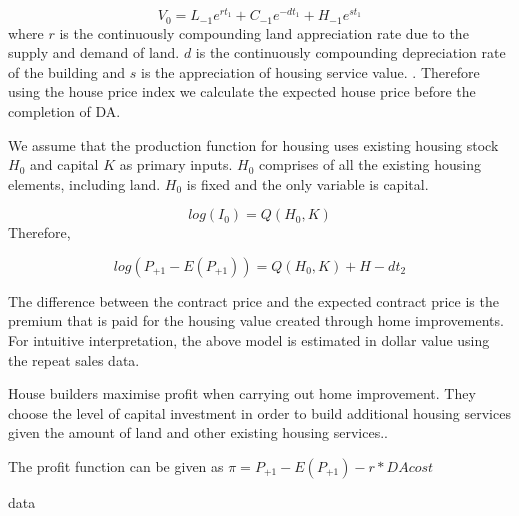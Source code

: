 $$V_{0}=L_{-1} e^{rt_1} + C_{-1} e^{-dt_1} + H_{-1} e^{st_1}$$ where $r$ is the continuously compounding land appreciation rate due to the supply and demand of land. $d$ is the continuously compounding depreciation rate of the building and $s$ is the appreciation of housing service value. . Therefore using the house price index we calculate the expected house price before the completion of DA. 




We assume that the production function for housing uses existing housing stock $H_0$ and capital $K$ as primary inputs. $H_0$ comprises of all the existing housing elements, including land. $H_0$ is fixed and the only variable is capital.

$$ log(I_0) = Q(H_0 , K) $$ Therefore, 

$$ log(P_{+1}-E(P_{+1})) = Q(H_0,K) + H - dt_2 $$

The difference between the contract price and the expected contract price is the premium that is paid for the housing value created through home improvements. For intuitive interpretation, the above model is estimated in dollar value using the repeat sales data.

House builders maximise profit when carrying out home improvement. They choose the level of capital investment in order to build additional housing services given the amount of land and other existing housing services..

The profit function can be given as $\pi = P_{+1} - E(P_{+1}) - r*DA cost$




data

%
%




%
%

%
%




